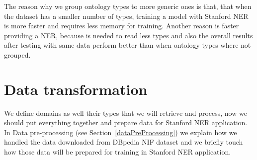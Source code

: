 \documentclass[thesis=M,english]{FITthesis}[2018/05/30]
\begin{document}
	The reason why we group ontology types to more generic ones is that, that when the dataset has a smaller number of types, training a model with Stanford NER is more faster and requires less memory for training. Another reason is faster providing a NER, because is needed to read less types and also the overall results after testing with same data perform better than when ontology types where not grouped.

\section{Data transformation}\label{StanfordNERoutput}
	We define domains as well their types that we will retrieve and process, now we should put everything together and prepare data for Stanford NER application. In Data pre-processing (see Section~\ref{dataPreProcessing}) we explain how we handled the data downloaded from DBpedia NIF dataset and we briefly touch how those data will be prepared for training in Stanford NER application. 
\end{document}
